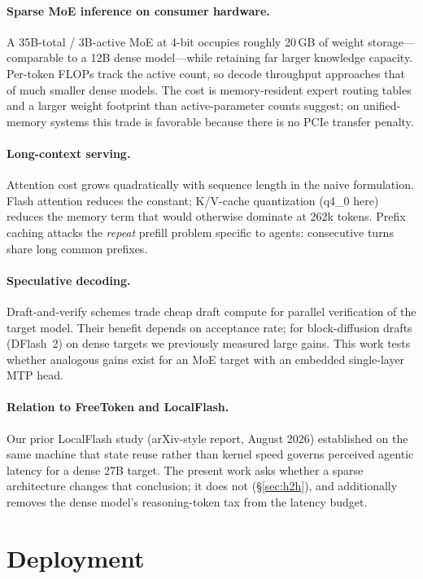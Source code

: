\documentclass[11pt]{article}
\begin{document}
\paragraph{Sparse MoE inference on consumer hardware.} A 35B-total / 3B-active
MoE at 4-bit occupies roughly 20\,GB of weight storage---comparable to a 12B
dense model---while retaining far larger knowledge capacity. Per-token FLOPs
track the active count, so decode throughput approaches that of much smaller
dense models. The cost is memory-resident expert routing tables and a larger
weight footprint than active-parameter counts suggest; on unified-memory
systems this trade is favorable because there is no PCIe transfer penalty.

\paragraph{Long-context serving.} Attention cost grows quadratically with
sequence length in the naive formulation. Flash attention reduces the constant;
K/V-cache quantization (q4\_0 here) reduces the memory term that would
otherwise dominate at 262k tokens. Prefix caching attacks the \emph{repeat}
prefill problem specific to agents: consecutive turns share long common
prefixes.

\paragraph{Speculative decoding.} Draft-and-verify schemes trade cheap draft
compute for parallel verification of the target model. Their benefit depends
on acceptance rate; for block-diffusion drafts (DFlash~2) on dense targets we
previously measured large gains. This work tests whether analogous gains exist
for an MoE target with an embedded single-layer MTP head.

\paragraph{Relation to FreeToken and LocalFlash.} Our prior LocalFlash study
(arXiv-style report, August 2026) established on the same machine that
state reuse rather than kernel speed governs perceived agentic latency for a
dense 27B target. The present work asks whether a sparse architecture changes
that conclusion; it does not (\S\ref{sec:h2h}), and additionally removes the
dense model's reasoning-token tax from the latency budget.

\section{Deployment}
\end{document}
